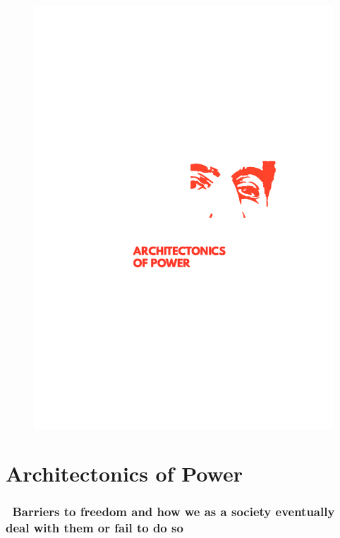 \begin{figure}[htbp]
\centering
\includegraphics{../../images/cost-of-freedom-architectonics-of-power.jpg}
\caption{}
\end{figure}

\section{Architectonics of Power}\label{architectonics-of-power}

\subsubsection{~Barriers to freedom and how we as a society eventually
deal with them or fail to do
so}\label{barriers-to-freedom-and-how-we-as-a-society-eventually-deal-with-them-or-fail-to-do-so}

